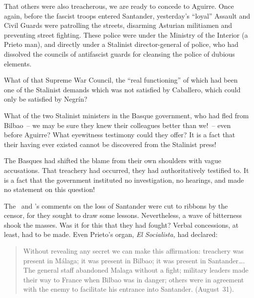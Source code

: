 \begin{sloppypar}
  That others were also treacherous, we are ready to concede to Aguirre. Once again, before the fascist troops entered Santander, yesterday’s ``loyal'' Assault and Civil Guards were patrolling the streets, disarming Asturian militiamen and preventing street fighting. These police were under the Ministry of the Interior (a Prieto man), and directly under a Stalinist director-general of police, who had dissolved the councils of antifascist guards for cleansing the police of dubious elements.

  What of that Supreme War Council, the ``real functioning'' of which had been one of the Stalinist demands which was not satisfied by Caballero, which could only be satisfied by Negr\'in?
  \nowidow
\end{sloppypar}

What of the two Stalinist ministers in the Basque government, who had fled from Bilbao~-- we may be sure they knew their colleagues better than we!~-- even before Aguirre? What eyewitness testimony could they offer? It is a fact that their having ever existed cannot be discovered from the Stalinist press!\kp%

The Basques had shifted the blame from their own shoulders with vague accusations. That treachery had occurred, they had authoritatively testified to. It is a fact that the government instituted no investigation, no hearings, and made no statement on this question!

The \UGT\ and \CNT’s comments on the loss of Santander were cut to ribbons by the censor, for they sought to draw some lessons. Nevertheless, a wave of bitterness shook the masses. Was it for this that they had fought? Verbal concessions, at least, had to be made. Even Prieto’s organ, \emph{El Socialista,} had declared: 

\begin{quotation}
  Without revealing any secret we can make this affirmation: treachery was present in M\'alaga; it was present in Bilbao; it was present in Santander\dots. The general staff abandoned Malaga without a fight; military leaders made their way to France when Bilbao was in danger; others were in agreement with the enemy to facilitate his entrance into Santander. (August~31).
\end{quotation}

